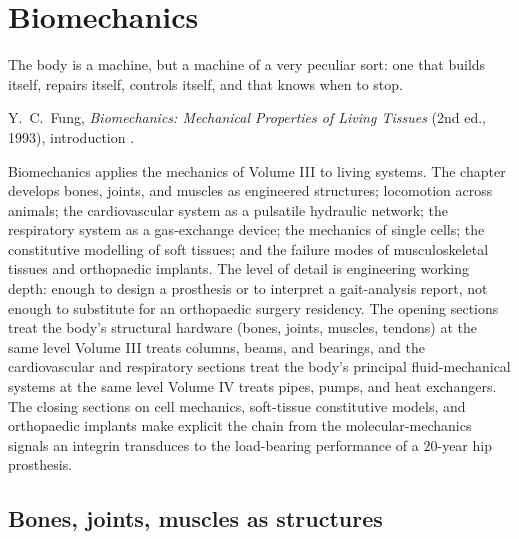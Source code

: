 \chapter{Biomechanics}
\label{vol06:ch06}

\epigraph{The body is a machine, but a machine of a very peculiar
sort: one that builds itself, repairs itself, controls itself, and
that knows when to stop.}{Y.\ C.\ Fung, \emph{Biomechanics: Mechanical
Properties of Living Tissues} (2nd ed., 1993), introduction
\cite[p.~1]{text:fung-biomechanics}.}


\noindent
Biomechanics applies the mechanics of Volume III to living systems.
The chapter develops bones, joints, and muscles as engineered
structures; locomotion across animals; the cardiovascular system as
a pulsatile hydraulic network; the respiratory system as a
gas-exchange device; the mechanics of single cells; the constitutive
modelling of soft tissues; and the failure modes of musculoskeletal
tissues and orthopaedic implants. The level of detail is engineering
working depth: enough to design a prosthesis or to interpret a
gait-analysis report, not enough to substitute for an orthopaedic
surgery residency. The opening sections treat the body's structural
hardware (bones, joints, muscles, tendons) at the same level Volume
III treats columns, beams, and bearings, and the cardiovascular and
respiratory sections treat the body's principal fluid-mechanical
systems at the same level Volume IV treats pipes, pumps, and heat
exchangers. The closing sections on cell mechanics, soft-tissue
constitutive models, and orthopaedic implants make explicit the
chain from the molecular-mechanics signals an integrin transduces to
the load-bearing performance of a $20$-year hip prosthesis.

\section{Bones, joints, muscles as structures}

